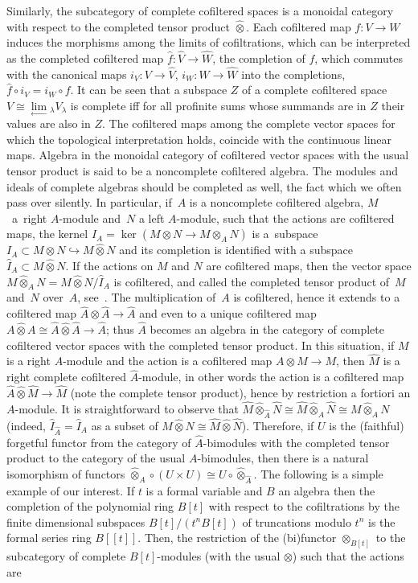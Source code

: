 \documentclass[10pt,a4paper]{amsart}
\def\Ker{\operatorname{ker}}
\numberwithin{equation}{section}
\begin{document}
Similarly, the subcategory of complete cofiltered spaces is a monoidal category with respect to the completed tensor product $\hat\otimes$. Each cofiltered map $f\colon V\to W$ induces the morphisms among the limits of cofiltrations, which can be interpreted as the completed cofiltered map $\hat{f}\colon \hat{V}\to\hat{W}$, the completion of $f$, which commutes with the canonical maps $i_V\colon V\to\hat{V}$, $i_W\colon W\to\hat{W}$ into the completions, $\hat{f}\circ i_V = i_W\circ f$. It can be seen that a subspace $Z$ of a complete cofiltered space $V\cong\underset\longleftarrow\lim{}_\lambda V_\lambda$ is complete iff for all profinite sums whose summands are in $Z$ their values are also in $Z$. The cofiltered maps among the complete vector spaces for which the topological interpretation holds, coincide with the continuous linear maps. Algebra in the monoidal category of cofiltered vector spaces with the usual tensor product is said to be a noncomplete cofiltered algebra. The modules and ideals of complete algebras should be completed as well, the fact which we often pass over silently. In particular, if~$A$ is a noncomplete cofiltered algebra, $M$~a~right $A$-module and~$N$ a left $A$-module, such that the actions are cofiltered maps, the kernel $I_A = \Ker(M\otimes N\to M\otimes_A N)$ is a~subspace $I_A\subset M\otimes N\hookrightarrow M\hat\otimes N$ and its completion is identified with a subspace $\hat{I}_A\subset M\hat\otimes N$. If the actions on $M$ and $N$ are cofiltered maps, then the vector space $M\hat\otimes_A N = M\hat\otimes N/\hat{I}_A$ is cofiltered, and called the completed tensor product of~$M$ and~$N$ over~$A$, see~\cite{stojicPhD}. The multiplication of~$A$ is cofiltered, hence it extends to a cofiltered map $\hat{A}\otimes\hat{A}\to\hat{A}$ and even to a unique cofiltered map $A\hat\otimes A\cong \hat{A}\hat\otimes\hat{A}\to\hat{A}$; thus $\hat{A}$ becomes an algebra in the category of complete cofiltered vector spaces with the completed tensor product. In this situation, if $M$ is a right $A$-module and the action is a cofiltered map $A\otimes M\to M$, then $\hat{M}$ is a right complete cofiltered $\hat{A}$-module, in other words the action is a cofiltered map $\hat{A}\hat\otimes\hat{M}\to\hat{M}$ (note the complete tensor product), hence by restriction a fortiori an $A$-module. It is straightforward to observe that $\hat{M}\hat\otimes_{\hat{A}}\hat{N}\cong\hat{M}\hat\otimes_A\hat{N}\cong M\hat\otimes_A N$ (indeed, $\hat{I}_{\hat{A}} = \hat{I}_A$ as a subset of $M\hat\otimes N\cong\hat{M}\hat\otimes\hat{N}$). Therefore, if $U$ is the (faithful) forgetful functor from the category of $\hat{A}$-bimodules with the completed tensor product to the category of the usual $A$-bimodules, then there is a natural isomorphism of functors $\hat\otimes_A \circ (U\times U)\cong U\circ \hat\otimes_{\hat{A}}$. The following is a simple example of our interest. If $t$ is a formal variable and $B$ an algebra then the completion of the polynomial ring $B[t]$ with respect to the cofiltrations by the finite dimensional subspaces $B[t]/(t^n B[t])$ of truncations modulo $t^n$ is the formal series ring $B[[t]]$. Then, the restriction of the (bi)functor $\otimes_{B[t]}$ to the subcategory of complete $B[t]$-modules (with the usual $\otimes$) such that the actions are 
\end{document}
